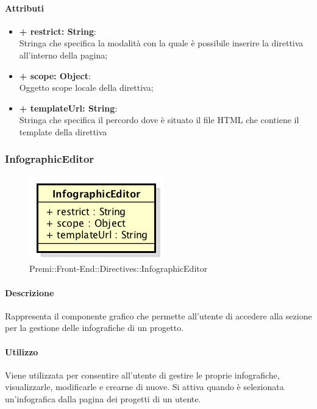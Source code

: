 	\paragraph{Attributi}
	\begin{itemize}
		\item \textbf{+ restrict: String}:\\
			Stringa che specifica la modalità con la quale è possibile inserire la direttiva all'interno della pagina;
		\item \textbf{+ scope: Object}:\\
			Oggetto scope locale della direttiva;
		\item \textbf{+ templateUrl: String}:\\
			Stringa che specifica il percordo dove è situato il file \gls{HTML} che contiene il \gls{template} della direttiva
	\end{itemize}
\newpage
	
	
\subsubsection{InfographicEditor}
	\begin{figure}[h]
		\centering
		\includegraphics[width=0.5\linewidth]{img/premi_front_end_directives_infographiceditor}
		\caption[Premi::Front-End::Directives::InfographicEditor]{Premi::Front-End::Directives::InfographicEditor}
	\end{figure}
	
	\paragraph{Descrizione}
		Rappresenta il componente grafico che permette all'utente di accedere alla sezione per la gestione delle infografiche di un progetto.
	
	\paragraph{Utilizzo}
	Viene utilizzata per consentire all'utente di gestire le proprie infografiche, visualizzarle, modificarle e crearne di nuove. Si attiva quando è selezionata un'\gls{infografica} dalla pagina dei progetti di un utente.
	
